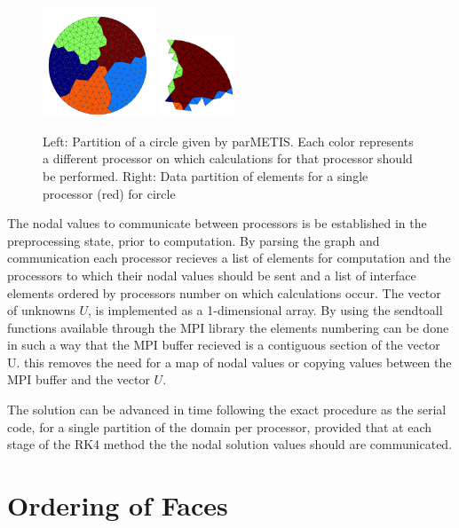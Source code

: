 \begin{figure}[htbp!]
 \centering
 \includegraphics[width=0.3\textwidth]{Figures/Parallelisation/parmetisPartition}
 \includegraphics[width=0.2\textwidth]{Figures/Parallelisation/parmetisDataPartition}
\caption{Left: Partition of a circle given by parMETIS. Each color represents a different processor on which calculations for that processor should be performed. Right: Data partition of elements for a single processor (red) for circle}
\label{parmetis-figure}
\end{figure}

The nodal values to communicate between processors is be established in the preprocessing state, prior to computation. By parsing the graph and communication each processor recieves a list of elements for computation and the processors to which their nodal values should be sent and a list of interface elements ordered by processors number on which calculations occur. The vector of unknowns $U$, is implemented as a 1-dimensional array. By using the sendtoall functions available through the MPI library the elements numbering can be done in such a way that the MPI buffer recieved is a contiguous section of the vector U. this removes the need for a map of nodal values or copying values between the MPI buffer and the vector $U$.

The solution can be advanced in time following the exact procedure as the serial code, for a single partition of the domain per processor, provided that at each stage of the RK4 method the the nodal solution values should are communicated.

\section{Ordering of Faces}

